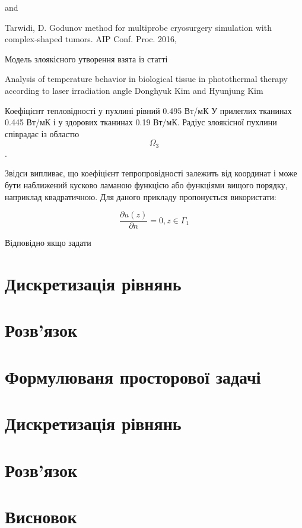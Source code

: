 and

Tarwidi, D. Godunov method for multiprobe cryosurgery simulation with complex-shaped tumors. AIP Conf. Proc. 2016,


Модель злоякісного утворення взята із статті

Analysis of temperature behavior in biological tissue in photothermal therapy according
to laser irradiation angle
Donghyuk Kim and Hyunjung Kim

Коефіцієнт тепловідності у пухлині рівний 0.495 Вт/мК
У прилеглих тканинах 0.445 Вт/мК і у здорових тканинах 0.19 Вт/мК.
Радіус злоякісної пухлини співрадає із областю $$\Omega_3$$.



Звідси випливає, що коефіцієнт тепропровідності залежить від координат і може бути наближений кусково ламаною функцією 
або функціями вищого порядку, наприклад квадратичною. Для даного прикладу пропонується використати:

\begin{equation}
    \label{eqn:thermo_2d_thermal_conductivity}

    \dfrac{\partial{u(z)}}{\partial{n}} = 0, z \in \Gamma_1
\end{equation}


Відповідно якщо задати 


\section{Дискретизація рівнянь}

\section{Розв'язок}

\section{Формулюваня просторової задачі}

\section{Дискретизація рівнянь}

\section{Розв'язок}

\section{Висновок}
